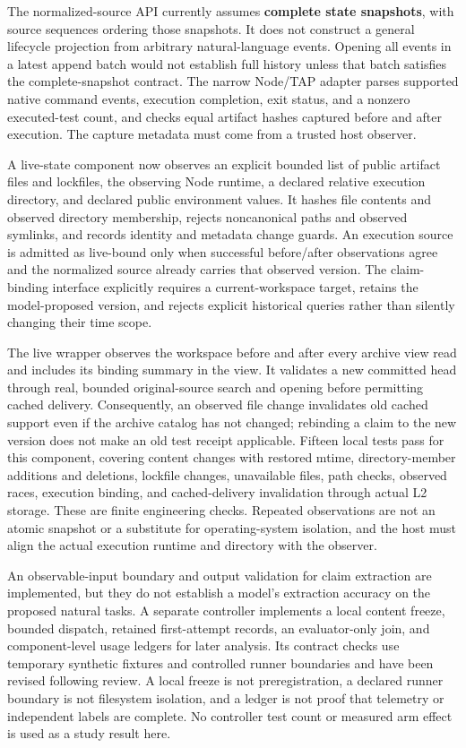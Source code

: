 The normalized-source API currently assumes \textbf{complete state
snapshots}, with source sequences ordering those snapshots. It does not
construct a general lifecycle projection from arbitrary natural-language
events. Opening all events in a latest append batch would not establish
full history unless that batch satisfies the complete-snapshot contract.
The narrow Node/TAP adapter parses supported native command events,
execution completion, exit status, and a nonzero executed-test count,
and checks equal artifact hashes captured before and after execution.
The capture metadata must come from a trusted host observer.

A live-state component now observes an explicit bounded list of public
artifact files and lockfiles, the observing Node runtime, a declared
relative execution directory, and declared public environment values. It
hashes file contents and observed directory membership, rejects
noncanonical paths and observed symlinks, and records identity and
metadata change guards. An execution source is admitted as live-bound
only when successful before/after observations agree and the normalized
source already carries that observed version. The claim-binding
interface explicitly requires a current-workspace target, retains the
model-proposed version, and rejects explicit historical queries rather
than silently changing their time scope.

The live wrapper observes the workspace before and after every archive
view read and includes its binding summary in the view. It validates a
new committed head through real, bounded original-source search and
opening before permitting cached delivery. Consequently, an observed
file change invalidates old cached support even if the archive catalog
has not changed; rebinding a claim to the new version does not make an
old test receipt applicable. Fifteen local tests pass for this
component, covering content changes with restored mtime,
directory-member additions and deletions, lockfile changes, unavailable
files, path checks, observed races, execution binding, and
cached-delivery invalidation through actual L2 storage. These are finite
engineering checks. Repeated observations are not an atomic snapshot or
a substitute for operating-system isolation, and the host must align the
actual execution runtime and directory with the observer.

An observable-input boundary and output validation for claim extraction
are implemented, but they do not establish a model's extraction accuracy
on the proposed natural tasks. A separate controller implements a local
content freeze, bounded dispatch, retained first-attempt records, an
evaluator-only join, and component-level usage ledgers for later
analysis. Its contract checks use temporary synthetic fixtures and
controlled runner boundaries and have been revised following review. A
local freeze is not preregistration, a declared runner boundary is not
filesystem isolation, and a ledger is not proof that telemetry or
independent labels are complete. No controller test count or measured
arm effect is used as a study result here.

